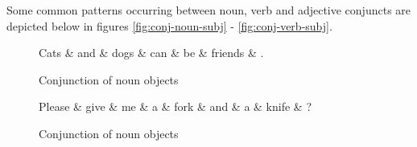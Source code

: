 Some common patterns occurring between noun, verb and adjective conjuncts are depicted below in figures \ref{fig:conj-noun-subj} - \ref{fig:conj-verb-subj}.

\begin{figure}[!ht]
\centering
\begin{minipage}[b]{0.45\textwidth}
\centering
	\begin{dependency}
		\begin{deptext}[]
	Cats \& and \& dogs \& can \& be \& friends \& . \\ 
		\end{deptext}
	\end{dependency}
\caption{Conjunction of noun objects}
\label{fig:conj-noun-subj}
\end{minipage}
\quad
\begin{minipage}[b]{0.45\textwidth}
\centering
	\begin{dependency}
		\begin{deptext}[]
	Please \& give \& me \& a \& fork \& and \& a \& knife \& ? \\ %
		\end{deptext}
	\end{dependency}
\caption{Conjunction of noun objects}
\label{fig:conj-noun-obj}
\end{minipage}
\end{figure}

